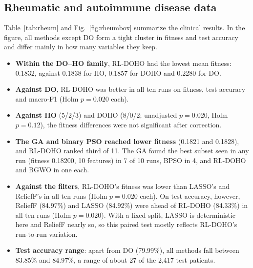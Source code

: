 \documentclass[journal]{IEEEtran}
\begin{document}
\subsection{Rheumatic and autoimmune disease data}
Table~\ref{tab:rheum} and Fig.~\ref{fig:rheumbox} summarize the clinical results. In the figure, all methods except DO form a tight cluster in fitness and test accuracy and differ mainly in how many variables they keep.
\begin{itemize}
\item \textbf{Within the DO--HO family}, RL-DOHO had the lowest mean fitness: 0.1832, against 0.1838 for HO, 0.1857 for DOHO and 0.2280 for DO.
\item \textbf{Against DO}, RL-DOHO was better in all ten runs on fitness, test accuracy and macro-F1 (Holm $p=0.020$ each).
\item \textbf{Against HO} (5/2/3) and DOHO (8/0/2; unadjusted $p=0.020$, Holm $p=0.12$), the fitness differences were not significant after correction.
\item \textbf{The GA and binary PSO reached lower fitness} (0.1821 and 0.1828), and RL-DOHO ranked third of 11. The GA found the best subset seen in any run (fitness 0.18200, 10 features) in 7 of 10 runs, BPSO in 4, and RL-DOHO and BGWO in one each.
\item \textbf{Against the filters}, RL-DOHO's fitness was lower than LASSO's and ReliefF's in all ten runs (Holm $p=0.020$ each). On test accuracy, however, ReliefF (84.97\%) and LASSO (84.92\%) were ahead of RL-DOHO (84.33\%) in all ten runs (Holm $p=0.020$). With a fixed split, LASSO is deterministic here and ReliefF nearly so, so this paired test mostly reflects RL-DOHO's run-to-run variation.
\item \textbf{Test accuracy range}: apart from DO (79.99\%), all methods fall between 83.85\% and 84.97\%, a range of about 27 of the 2,417 test patients.
\end{itemize}
\end{document}
